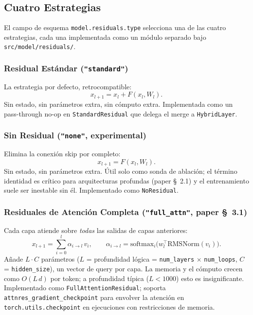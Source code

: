 \subsection{Cuatro Estrategias}

El campo de esquema \texttt{model.residuals.type} selecciona una de las
cuatro estrategias, cada una implementada como un módulo separado bajo
\texttt{src/model/residuals/}.

\subsubsection{Residual Estándar (\texttt{"standard"})}

La estrategia por defecto, retrocompatible:
\[
x_{l+1} = x_l + F(x_l, W_l).
\]
Sin estado, sin parámetros extra, sin cómputo extra. Implementada como
un pass-through no-op en \texttt{StandardResidual} que delega el merge
a \texttt{HybridLayer}.

\subsubsection{Sin Residual (\texttt{"none"}, experimental)}

Elimina la conexión skip por completo:
\[
x_{l+1} = F(x_l, W_l).
\]
Sin estado, sin parámetros extra. Útil solo como sonda de ablación; el
término identidad es crítico para arquitecturas profundas (paper
\S~2.1) y el entrenamiento suele ser inestable sin él. Implementado
como \texttt{NoResidual}.

\subsubsection{Residuales de Atención Completa (\texttt{"full\_attn"}, paper \S~3.1)}

Cada capa atiende sobre \emph{todas} las salidas de capas anteriores:
\[
x_{l+1} = \sum_{i=0}^{l} \alpha_{i \to l} \, v_i, \qquad
\alpha_{i \to l} = \mathrm{softmax}_i\!\big(w_l^{\top} \mathrm{RMSNorm}(v_i)\big).
\]
Añade $L \cdot C$ parámetros ($L$ = profundidad lógica =
\texttt{num\_layers} $\times$ \texttt{num\_loops}, $C$ =
\texttt{hidden\_size}), un vector de query por capa. La memoria y el
cómputo crecen como $O(L \, d)$ por token; a profundidad típica
($L < 1000$) esto es insignificante. Implementado como
\texttt{FullAttentionResidual}; soporta
\texttt{attnres\_gradient\_checkpoint} para envolver la atención en
\texttt{torch.utils.checkpoint} en ejecuciones con restricciones de
memoria.

